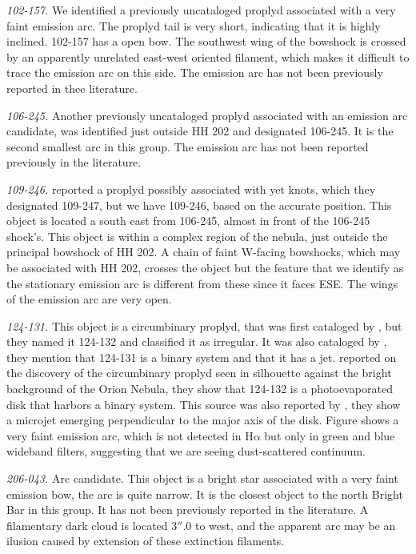 \documentclass[iop, apj]{emulateapj}
\newcommand\ha{\ensuremath{\mathrm{H\alpha}}}
\begin{document}
\textit{102-157.} We identified a previously uncataloged proplyd associated with a very faint emission arc. The proplyd tail is very short, indicating that it is highly inclined. 102-157 has a open bow. The southwest wing of the bowshock is crossed by an apparently unrelated east-west oriented filament, which makes it difficult to trace the emission arc on this side. The emission arc has not been previously reported in thee literature. 

\textit{106-245.} Another previously uncataloged proplyd associated with an emission arc candidate, was identified just outside HH 202 and designated 106-245. It is the second smallest arc in this group. The emission arc has not been reported previously in the literature. 

\textit{109-246.} \citet{Bally:2000a} reported a proplyd possibly associated with yet knots, which they designated 109-247, but we have 109-246, based on the accurate position. This object is located a south east from 106-245, almost in front of the 106-245 shock's. This object is within a complex region of the nebula, just outside the principal bowshock of HH 202. A chain of faint W-facing bowshocks, which may be associated with HH 202, crosses the object but the feature that we identify as the stationary emission arc is different from these since it faces ESE. The wings of the emission arc are very open.    

\textit{124-131.} This object is a circumbinary proplyd, that  was first cataloged by \citet{ODell:1996a}, but they named it 124-132 and classified it as irregular. It was also cataloged by \citet{Ricci:2008a}, they mention that 124-131 is a binary system and that it has a jet. \citet{Robberto:2008a} reported on the discovery of the circumbinary proplyd seen in silhouette against the bright background of the Orion Nebula, they show that 124-132 is a photoevaporated disk that harbors a binary system. This source was also reported by \citet{Smith:2005a}, they show a microjet emerging perpendicular to the major axis of the disk. Figure shows a very faint emission arc, which is not detected in \ha{} but only in green and blue wideband filters, suggesting that we are seeing dust-scattered continuum.
 
\textit{206-043.} Arc candidate. This object is a bright star associated with a very faint emission bow, the arc is quite narrow. It is the  closest object to the north Bright Bar in this group. It has not been previously reported in the literature. A filamentary dark cloud is located \(3''.0\) to west, and the apparent arc may be an ilusion caused by extension of these extinction filaments.
\end{document}
